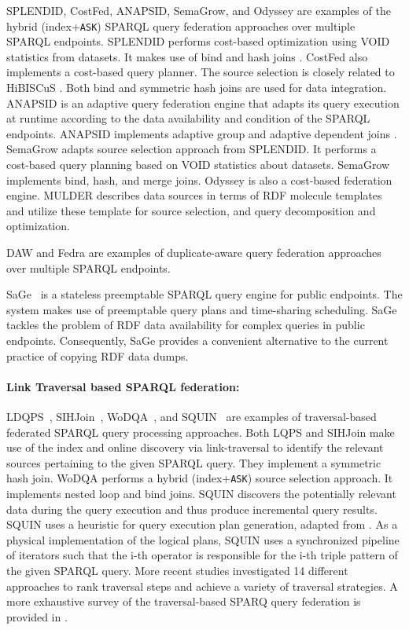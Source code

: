 \documentclass[sw]{iosart2x}
\begin{document}
SPLENDID, CostFed, ANAPSID, SemaGrow, and Odyssey are examples of the hybrid (index+\texttt{ASK}) SPARQL query federation approaches over multiple SPARQL endpoints. SPLENDID performs cost-based optimization using VOID statistics from datasets.
It makes use of bind and hash joins \cite{saleem2015fine}. %
CostFed also implements a cost-based query planner.
The source selection is closely related to HiBISCuS \cite{hibiscus2014}.
Both bind and symmetric hash joins are used for data integration.
ANAPSID \cite{anapsid2011} is an adaptive query federation engine that adapts its query execution at runtime according to the data availability and condition of the SPARQL endpoints.
ANAPSID implements adaptive group and adaptive dependent joins \cite{saleem2015fine}.
SemaGrow adapts source selection approach from SPLENDID.
It performs a cost-based query planning based on VOID statistics about datasets.
SemaGrow implements bind, hash, and merge joins.
Odyssey is also a cost-based federation engine.
MULDER describes data sources in terms of RDF molecule templates and utilize these template for source selection, and query decomposition and optimization.

DAW \cite{daw2013} and Fedra \cite{fedra2015} are examples of duplicate-aware query federation approaches over multiple SPARQL endpoints.

SaGe~\cite{DBLP:journals/corr/abs-1806-00227} is a stateless preemptable SPARQL query engine for public endpoints.
The system makes use of preemptable query plans and time-sharing scheduling.
SaGe tackles the problem of RDF data availability for complex queries in public endpoints.
Consequently, SaGe provides a convenient alternative to the current practice of copying RDF data dumps.

\paragraph*{\textbf{Link Traversal based SPARQL federation:}} LDQPS~\cite{ldqp2010}, SIHJoin~\cite{sihjoin2011}, WoDQA~\cite{wodqa2012}, and SQUIN~\cite{hartig2013squin} are examples of traversal-based federated SPARQL query processing approaches. 
Both LQPS and SIHJoin make use of the index and online discovery via link-traversal to identify the relevant sources pertaining to the given SPARQL query.
They implement a symmetric hash join.
WoDQA performs a hybrid (index+\texttt{ASK}) source selection approach.
It implements nested loop and bind joins.
SQUIN discovers the potentially relevant data during the query execution and thus produce incremental query results.
SQUIN uses a heuristic for query execution plan generation, adapted from \cite{zk2011}.
As a physical implementation of the logical plans, SQUIN uses a synchronized pipeline of iterators such that the i-th operator is responsible for the i-th triple pattern of the given SPARQL query.
More recent studies \cite{hartig2016walking} investigated 14 different approaches to rank traversal steps and achieve a variety of traversal strategies.
A more exhaustive survey of the traversal-based SPARQ query federation is provided in \cite{hartig2009executing}.
\end{document}
